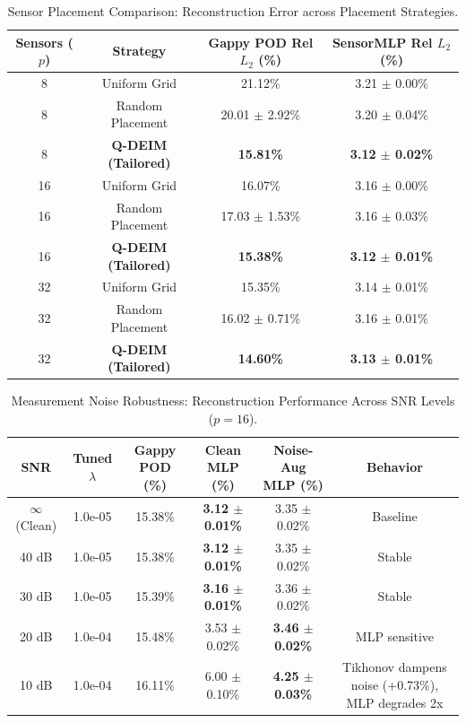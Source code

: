 \begin{table}[h!]
\centering
\caption{Sensor Placement Comparison: Reconstruction Error across Placement Strategies.}
\label{tab:sensor_placement_comparison}
\begin{tabular}{cccc}
\toprule
\textbf{Sensors ($p$)} & \textbf{Strategy} & \textbf{Gappy POD Rel $L_2$ (\%)} & \textbf{SensorMLP Rel $L_2$ (\%)} \\
\midrule
8 & Uniform Grid & 21.12\% & 3.21 $\pm$ 0.00\% \\
8 & Random Placement & 20.01 $\pm$ 2.92\% & 3.20 $\pm$ 0.04\% \\
8 & \textbf{Q-DEIM (Tailored)} & \textbf{15.81\%} & \textbf{3.12 $\pm$ 0.02\%} \\
\midrule
16 & Uniform Grid & 16.07\% & 3.16 $\pm$ 0.00\% \\
16 & Random Placement & 17.03 $\pm$ 1.53\% & 3.16 $\pm$ 0.03\% \\
16 & \textbf{Q-DEIM (Tailored)} & \textbf{15.38\%} & \textbf{3.12 $\pm$ 0.01\%} \\
\midrule
32 & Uniform Grid & 15.35\% & 3.14 $\pm$ 0.01\% \\
32 & Random Placement & 16.02 $\pm$ 0.71\% & 3.16 $\pm$ 0.01\% \\
32 & \textbf{Q-DEIM (Tailored)} & \textbf{14.60\%} & \textbf{3.13 $\pm$ 0.01\%} \\
\bottomrule
\end{tabular}
\end{table}

\begin{table}[h!]
\centering
\caption{Measurement Noise Robustness: Reconstruction Performance Across SNR Levels ($p = 16$).}
\label{tab:noise_robustness}
\begin{tabular}{cccccc}
\toprule
\textbf{SNR} & \textbf{Tuned $\lambda$} & \textbf{Gappy POD (\%)} & \textbf{Clean MLP (\%)} & \textbf{Noise-Aug MLP (\%)} & \textbf{Behavior} \\
\midrule
$\infty$ (Clean) & 1.0e-05 & 15.38\% & \textbf{3.12 $\pm$ 0.01\%} & 3.35 $\pm$ 0.02\% & Baseline \\
40 dB & 1.0e-05 & 15.38\% & \textbf{3.12 $\pm$ 0.01\%} & 3.35 $\pm$ 0.02\% & Stable \\
30 dB & 1.0e-05 & 15.39\% & \textbf{3.16 $\pm$ 0.01\%} & 3.36 $\pm$ 0.02\% & Stable \\
20 dB & 1.0e-04 & 15.48\% & 3.53 $\pm$ 0.02\% & \textbf{3.46 $\pm$ 0.02\%} & MLP sensitive \\
10 dB & 1.0e-04 & 16.11\% & 6.00 $\pm$ 0.10\% & \textbf{4.25 $\pm$ 0.03\%} & Tikhonov dampens noise (+0.73\%), MLP degrades 2x \\
\bottomrule
\end{tabular}
\end{table}

